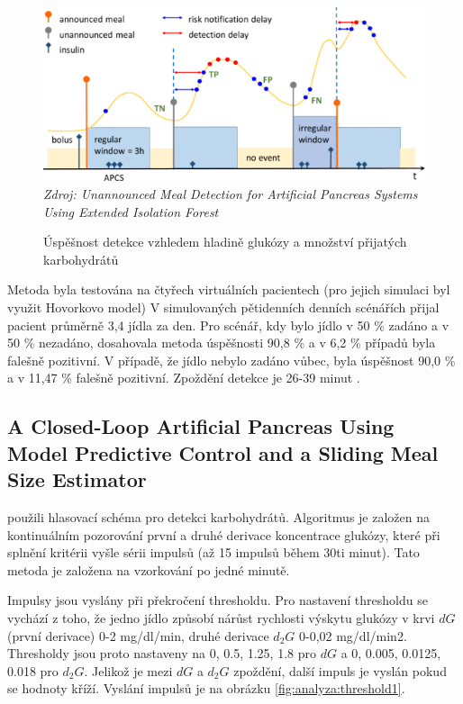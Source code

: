 \begin{figure}[H]
\caption{Úspěšnost detekce vzhledem hladině glukózy a množství přijatých karbohydrátů}
\label{fig:analyza:forest}
\includegraphics[width=1\textwidth]{img/analyzaCHO/forest.png}\\
\textit{Zdroj: Unannounced Meal Detection for Artificial Pancreas Systems Using Extended Isolation Forest \citep{analyzaCHO.ExtendedIsolationForest}}
\end{figure}

Metoda byla testována na čtyřech virtuálních pacientech (pro jejich simulaci byl využit Hovorkovo model) V simulovaných pětidenních denních scénářích přijal pacient průměrně 3,4 jídla za den. Pro scénář, kdy bylo jídlo v 50 \% zadáno a v 50 \% nezadáno, dosahovala metoda úspěšnosti 90,8 \% a v 6,2 \% případů byla falešně pozitivní. V případě, že jídlo nebylo zadáno vůbec, byla úspěšnost 90,0 \% a v 11,47 \% falešně pozitivní. Zpoždění detekce je 26-39 minut \citep{analyzaCHO.ExtendedIsolationForest}.


\subsection{A Closed-Loop Artificial Pancreas Using Model Predictive Control and a Sliding Meal Size Estimator}
\label{ch:analyzaCHO:thrashold}

\citet{analyzaCHO.Thresholds} použili hlasovací schéma pro detekci karbohydrátů. Algoritmus je založen na kontinuálním  pozorování první a druhé derivace koncentrace glukózy, které při splnění kritérii vyšle sérii impulsů (až 15 impulsů během 30ti minut). Tato metoda je založena na vzorkování po jedné minutě.

Impulsy jsou vyslány při překročení thresholdu. Pro nastavení thresholdu se vychází z toho, že jedno jídlo způsobí nárůst rychlosti výskytu glukózy v krvi $dG$ (první derivace) 0-2 mg/dl/min, druhé derivace $d_{2}G$ 0-0,02 mg/dl/min2. Thresholdy jsou proto nastaveny na {0, 0.5, 1.25, 1.8} pro $dG$ a {0, 0.005, 0.0125, 0.018} pro $d_{2}G$. Jelikož je mezi $dG$ a $d_{2}G$ zpoždění, další impuls je vyslán pokud se hodnoty kříží. Vyslání impulsů je na obrázku \ref{fig:analyza:threshold1}.
 
